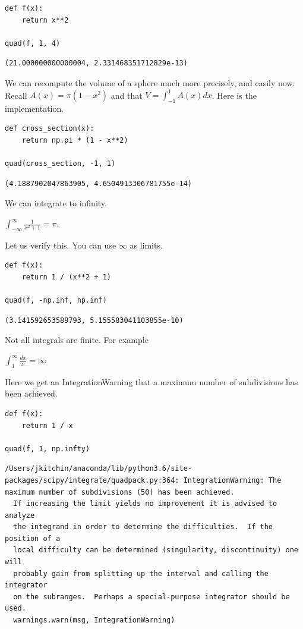 \documentclass[11pt]{article}
\begin{document}
\begin{verbatim}
def f(x):
    return x**2

quad(f, 1, 4)
\end{verbatim}

\begin{verbatim}
(21.000000000000004, 2.331468351712829e-13)
\end{verbatim}

We can recompute the volume of a sphere much more precisely, and easily now. Recall \(A(x) = \pi (1 - x^2)\) and that \(V = \int_{-1}^{1} A(x) dx\). Here is the implementation.

\begin{verbatim}
def cross_section(x):
    return np.pi * (1 - x**2)

quad(cross_section, -1, 1)
\end{verbatim}

\begin{verbatim}
(4.1887902047863905, 4.6504913306781755e-14)
\end{verbatim}

We can integrate to infinity.

\(\int_{-\infty}^{\infty} \frac{1}{x^2 + 1} = \pi\).

Let us verify this. You can use \textpm{} \(\infty\) as limits.

\begin{verbatim}
def f(x):
    return 1 / (x**2 + 1)

quad(f, -np.inf, np.inf)
\end{verbatim}

\begin{verbatim}
(3.141592653589793, 5.155583041103855e-10)
\end{verbatim}

Not all integrals are finite. For example

\(\int_1^\infty \frac{dx}{x} = \infty\)

Here we get an IntegrationWarning that a maximum number of subdivisions has been achieved.

\begin{verbatim}
def f(x):
    return 1 / x

quad(f, 1, np.infty)
\end{verbatim}

\begin{verbatim}
/Users/jkitchin/anaconda/lib/python3.6/site-packages/scipy/integrate/quadpack.py:364: IntegrationWarning: The maximum number of subdivisions (50) has been achieved.
  If increasing the limit yields no improvement it is advised to analyze
  the integrand in order to determine the difficulties.  If the position of a
  local difficulty can be determined (singularity, discontinuity) one will
  probably gain from splitting up the interval and calling the integrator
  on the subranges.  Perhaps a special-purpose integrator should be used.
  warnings.warn(msg, IntegrationWarning)

\end{verbatim}
\end{document}
